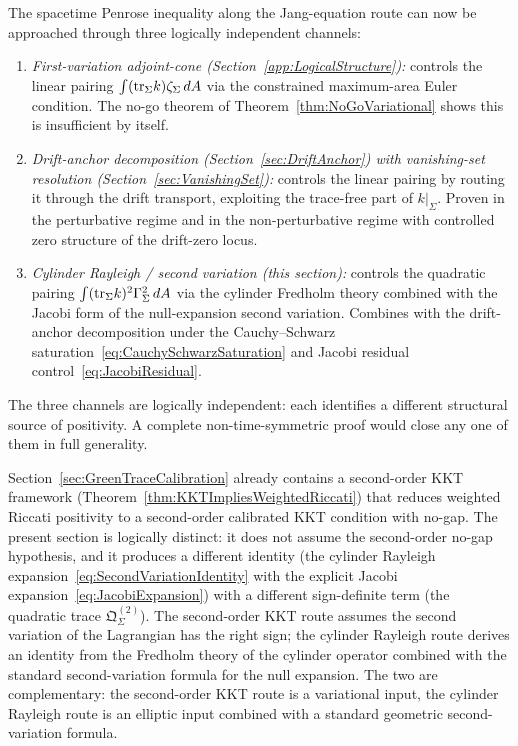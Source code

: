 \begin{remark}\label{rem:ThreeChannels}
The spacetime Penrose inequality along the Jang-equation route can now be approached through three logically independent channels:
\begin{enumerate}
    \item \emph{First-variation adjoint-cone (Section~\ref{app:LogicalStructure}):} controls the linear pairing $\int(\mathrm{tr}_\Sigma k)\zeta_\Sigma\,dA$ via the constrained maximum-area Euler condition. The no-go theorem of Theorem~\ref{thm:NoGoVariational} shows this is insufficient by itself.
    \item \emph{Drift-anchor decomposition (Section~\ref{sec:DriftAnchor}) with vanishing-set resolution (Section~\ref{sec:VanishingSet}):} controls the linear pairing by routing it through the drift transport, exploiting the trace-free part of $k|_\Sigma$. Proven in the perturbative regime and in the non-perturbative regime with controlled zero structure of the drift-zero locus.
    \item \emph{Cylinder Rayleigh / second variation (this section):} controls the quadratic pairing $\int(\mathrm{tr}_\Sigma k)^2\Gamma_\Sigma^2\,dA$ via the cylinder Fredholm theory combined with the Jacobi form of the null-expansion second variation. Combines with the drift-anchor decomposition under the Cauchy--Schwarz saturation~\eqref{eq:CauchySchwarzSaturation} and Jacobi residual control~\eqref{eq:JacobiResidual}.
\end{enumerate}
The three channels are logically independent: each identifies a different structural source of positivity. A complete non-time-symmetric proof would close any one of them in full generality.
\end{remark}

\begin{remark}\label{rem:VsSecondOrderKKT}
Section~\ref{sec:GreenTraceCalibration} already contains a second-order KKT framework (Theorem~\ref{thm:KKTImpliesWeightedRiccati}) that reduces weighted Riccati positivity to a second-order calibrated KKT condition with no-gap. The present section is logically distinct: it does not assume the second-order no-gap hypothesis, and it produces a different identity (the cylinder Rayleigh expansion~\eqref{eq:SecondVariationIdentity} with the explicit Jacobi expansion~\eqref{eq:JacobiExpansion}) with a different sign-definite term (the quadratic trace $\mathfrak Q_\Sigma^{(2)}$). The second-order KKT route assumes the second variation of the Lagrangian has the right sign; the cylinder Rayleigh route derives an identity from the Fredholm theory of the cylinder operator combined with the standard second-variation formula for the null expansion. The two are complementary: the second-order KKT route is a variational input, the cylinder Rayleigh route is an elliptic input combined with a standard geometric second-variation formula.
\end{remark}
